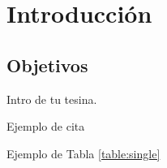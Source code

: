 \chapter{Introducción} \label{cap:intro}

\section{Objetivos} \label{cap:intro:sec:obj}

Intro de tu tesina.

Ejemplo de cita \cite{browns:original}



Ejemplo de Tabla \ref{table:single}

